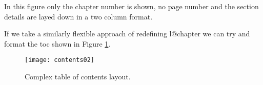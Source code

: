 

In this figure only the chapter number is shown, no page number and the section details are layed down in a two column format.


If we take a similarly flexible approach of redefining l@chapter we can try and format the toc shown in Figure \ref{fig:tocsteward}.

\begin{figure}[tp]
\texttt{[image: contents02]}
\caption{Complex table of contents layout.}
\label{fig:tocsteward}
\end{figure}


